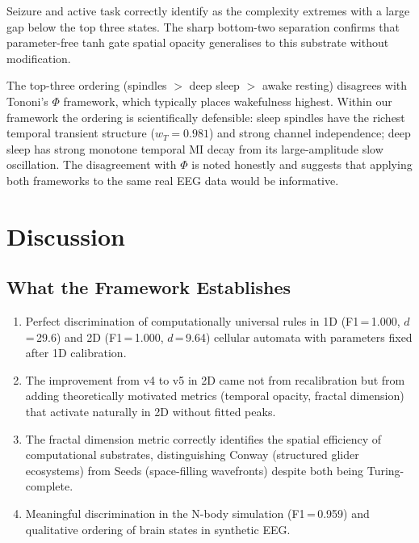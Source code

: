 \documentclass[12pt,a4paper]{article}
\begin{document}
Seizure and active task correctly identify as the complexity extremes
with a large gap below the top three states.
The sharp bottom-two separation confirms that parameter-free tanh
gate spatial opacity generalises to this substrate without
modification.

The top-three ordering (spindles $>$ deep sleep $>$ awake resting)
disagrees with Tononi's $\Phi$ framework, which typically places
wakefulness highest.
Within our framework the ordering is scientifically defensible:
sleep spindles have the richest temporal transient structure
($w_T=0.981$) and strong channel independence; deep sleep has strong
monotone temporal MI decay from its large-amplitude slow oscillation.
The disagreement with $\Phi$ is noted honestly and suggests that
applying both frameworks to the same real EEG data would be
informative.

\section{Discussion}
\label{sec:discussion}

\subsection{What the Framework Establishes}

\begin{enumerate}[noitemsep]
  \item Perfect discrimination of computationally universal rules in
    1D (F1\,=\,1.000, $d$\,=\,29.6) and 2D (F1\,=\,1.000,
    $d$\,=\,9.64) cellular automata with parameters fixed after 1D
    calibration.

  \item The improvement from v4 to v5 in 2D came not from
    recalibration but from adding theoretically motivated metrics
    (temporal opacity, fractal dimension) that activate naturally in
    2D without fitted peaks.

  \item The fractal dimension metric correctly identifies the spatial
    efficiency of computational substrates, distinguishing Conway
    (structured glider ecosystems) from Seeds (space-filling
    wavefronts) despite both being Turing-complete.

  \item Meaningful discrimination in the N-body simulation
    (F1\,=\,0.959) and qualitative ordering of brain states in
    synthetic EEG.
\end{enumerate}
\end{document}
